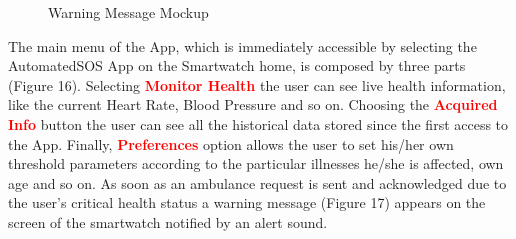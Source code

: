 \begin{enumerate}
\begin{figure}
\begin{center}
\begin{minipage}[c]{.40\textwidth}
          	\caption{Warning Message Mockup}
        \end{minipage}
      \end{center}
\end{figure}
The main menu of the App, which is immediately accessible by selecting the AutomatedSOS App on the Smartwatch home, is composed by three parts (Figure 16). Selecting {\textcolor{Red}{\textbf{Monitor Health}}} the user can see live health information, like the current Heart Rate, Blood Pressure and so on. Choosing the {\textcolor{Red}{\textbf{Acquired Info}}} button the user can see all the historical data stored since the first access to the App. Finally, {\textcolor{Red}{\textbf{Preferences}}} option allows the user to set his/her own threshold parameters according to the particular illnesses he/she is affected, own age and so on. As soon as an ambulance request is sent and acknowledged due to the user's critical health status a warning message (Figure 17) appears on the screen of the smartwatch notified by an alert sound.
\clearpage


\end{enumerate}
